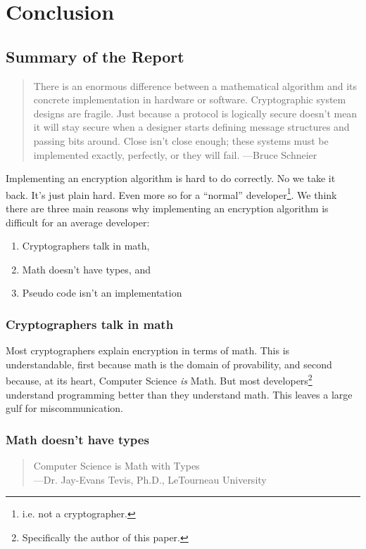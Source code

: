\section{Conclusion}

\subsection{Summary of the Report}

\blockquote[\cite{Schneier:Harder}]{There is an enormous difference between a mathematical algorithm and its concrete implementation in hardware or software. Cryptographic system designs are fragile. Just because a protocol is logically secure doesn't mean it will stay secure when a designer starts defining message structures and passing bits around. Close isn't close enough; these systems must be implemented exactly, perfectly, or they will fail. ---Bruce Schneier}

Implementing an encryption algorithm is hard to do correctly. No we take it back. It's just plain hard. Even more so for a \enquote{normal} developer\footnote{i.e. not a cryptographer.}. We think there are three main reasons why implementing an encryption algorithm is difficult for an average developer:

\begin{enumerate}
\item Cryptographers talk in math,
\item Math doesn't have types, and
\item Pseudo code isn't an implementation
\end{enumerate}

\subsubsection{Cryptographers talk in math}

Most cryptographers explain encryption in terms of math. This is understandable, first because math is the domain of provability, and second because, at its heart, Computer Science \emph{is} Math. But most developers\footnote{Specifically the author of this paper.} understand programming better than they understand math. This leaves a large gulf for miscommunication.

\subsubsection{Math doesn't have types}
\blockquote{Computer Science is Math with Types\\ ---Dr. Jay-Evans Tevis, Ph.D., LeTourneau University}

